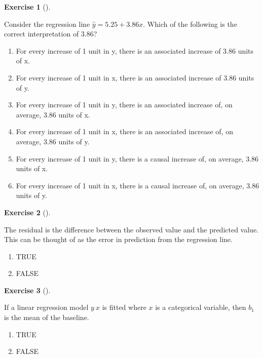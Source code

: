 \documentclass[
  letterpaper,
  DIV=11,
  numbers=noendperiod]{scrreprt}
\providecommand{\tightlist}{%
  \setlength{\itemsep}{0pt}\setlength{\parskip}{0pt}}\usepackage{longtable,booktabs,array}
\theoremstyle{definition}
\newtheorem{exercise}{Exercise}[chapter]
\theoremstyle{remark}
\begin{document}
\leavevmode{}%
\begin{exercise}[]\label{exr-ch05-c07}

Consider the regression line \(\hat{y}=5.25+3.86x\). Which of the
following is the correct interpretation of 3.86?

\begin{enumerate}
\def\labelenumi{\alph{enumi})}
\tightlist
\item
  For every increase of 1 unit in y, there is an associated increase of
  3.86 units of x.
\item
  For every increase of 1 unit in x, there is an associated increase of
  3.86 units of y.
\item
  For every increase of 1 unit in y, there is an associated increase of,
  on average, 3.86 units of x.
\item
  For every increase of 1 unit in x, there is an associated increase of,
  on average, 3.86 units of y.
\item
  For every increase of 1 unit in y, there is a causal increase of, on
  average, 3.86 units of x.
\item
  For every increase of 1 unit in x, there is a causal increase of, on
  average, 3.86 units of y.
\end{enumerate}

\end{exercise}

\leavevmode{}%
\begin{exercise}[]\label{exr-ch05-c08}

The residual is the difference between the observed value and the
predicted value. This can be thought of as the error in prediction from
the regression line.

\begin{enumerate}
\def\labelenumi{\alph{enumi})}
\tightlist
\item
  TRUE
\item
  FALSE
\end{enumerate}

\end{exercise}

\leavevmode{}%
\begin{exercise}[]\label{exr-ch05-c09}

If a linear regression model \(y ~ x\) is fitted where \(x\) is a
categorical variable, then \(b_1\) is the mean of the baseline.

\begin{enumerate}
\def\labelenumi{\alph{enumi})}
\tightlist
\item
  TRUE
\item
  FALSE
\end{enumerate}

\end{exercise}
\end{document}
